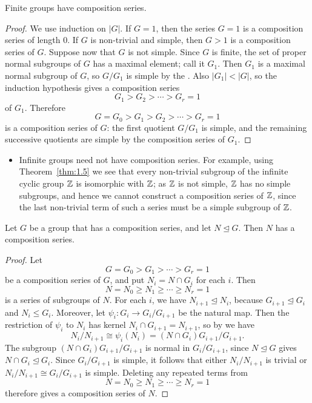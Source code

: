 \documentclass[../Odyssey_Project.tex]{subfiles}
\begin{document}
\begin{proposition}
\label{prop:10.1}
Finite groups have composition series.
\end{proposition}
\begin{proof}
We use induction on $\lvert G\rvert$. If $G=1$, then the series $G=1$ is a composition series of length $0$. If $G$ is non-trivial and simple, then $G>1$ is a composition series of $G$. Suppose now that $G$ is not simple. Since $G$ is finite, the set of proper normal subgroups of $G$ has a maximal element; call it $G_1$. Then $G_1$ is a maximal normal subgroup of $G$, so $G/G_1$ is simple by the . Also $\lvert G_1\rvert<\lvert G\rvert$, so the induction hypothesis gives a composition series
\[
  G_1>G_2>\cdots>G_r=1
\]
of $G_1$. Therefore
\[
  G=G_0>G_1>G_2>\cdots>G_r=1
\]
is a composition series of $G$: the first quotient $G/G_1$ is simple, and the remaining successive quotients are simple by the composition series of $G_1$.
\end{proof}

\begin{itemize}
  \item Infinite groups need not have composition series. For example, using Theorem~\ref{thm:1.5} we see that every non-trivial subgroup of the infinite cyclic group $\mathbb{Z}$ is isomorphic with $\mathbb{Z}$; as $\mathbb{Z}$ is not simple, $\mathbb{Z}$ has no simple subgroups, and hence we cannot construct a composition series of $\mathbb{Z}$, since the last non-trivial term of such a series must be a simple subgroup of $\mathbb{Z}$.
\end{itemize}

\begin{lemma}
\label{lem:10.2}
Let $G$ be a group that has a composition series, and let $N \trianglelefteq G$. Then $N$ has a composition series.
\end{lemma}
\begin{proof}
Let
\[
  G=G_0>G_1>\cdots>G_r=1
\]
be a composition series of $G$, and put $N_i=N\cap G_i$ for each $i$. Then
\[
  N=N_0\geq N_1\geq\cdots\geq N_r=1
\]
is a series of subgroups of $N$. For each $i$, we have $N_{i+1}\trianglelefteq N_i$, because $G_{i+1}\trianglelefteq G_i$ and $N_i\leq G_i$. Moreover,
let $\psi_i\colon G_i\to G_i/G_{i+1}$ be the natural map. Then the restriction of $\psi_i$ to $N_i$ has kernel $N_i\cap G_{i+1}=N_{i+1}$, so by  we have
\[
  N_i/N_{i+1}
  \cong
  \psi_i(N_i)
  =
  (N\cap G_i)G_{i+1}/G_{i+1}.
\]
The subgroup $(N\cap G_i)G_{i+1}/G_{i+1}$ is normal in $G_i/G_{i+1}$, since $N\trianglelefteq G$ gives $N\cap G_i\trianglelefteq G_i$. Since $G_i/G_{i+1}$ is simple, it follows that either $N_i/N_{i+1}$ is trivial or $N_i/N_{i+1}\cong G_i/G_{i+1}$ is simple. Deleting any repeated terms from
\[
  N=N_0\geq N_1\geq\cdots\geq N_r=1
\]
therefore gives a composition series of $N$.
\end{proof}
\end{document}
